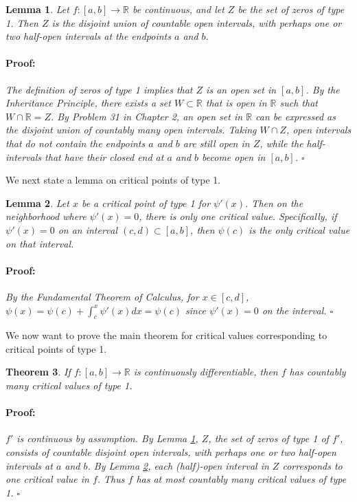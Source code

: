 \documentclass{article}
\newenvironment{proof}{\paragraph{Proof:}}{\hfill$\square$}
\newtheorem{theorem}{Theorem}
\newtheorem{lemma}[theorem]{Lemma}
\newcommand{\R}{\mathbb{R}}
\begin{document}
\begin{lemma}
\label{LemmaZerosType1}
Let $f: [a, b] \rightarrow \R$ be continuous, and let $Z$ be the set of zeros of type 1. Then $Z$ is the  disjoint union of countable open intervals, with perhaps one or two half-open intervals at the endpoints $a$ and $b$.
\begin{proof}
The definition of zeros of type 1 implies that $Z$ is an open set in $[a, b]$. By the Inheritance Principle, there exists a set $W \subset \R$ that is open in $\R$ such that $W \cap \R = Z$. By Problem 31 in Chapter 2, an open set in $\R$ can be expressed as the disjoint union of countably many open intervals. Taking $W \cap Z$, open intervals that do not contain the endpoints $a$ and $b$ are still open in $Z$, while the half-intervals that have their closed end at $a$ and $b$ become open in $[a, b]$.
\end{proof}
\end{lemma}

We next state a lemma on critical points of type 1.

\begin{lemma}
\label{LemmaCriticalValuesType1}
Let $x$ be a critical point of type 1 for $\psi'(x)$. Then on the neighborhood where $\psi'(x) = 0$, there is only one critical value. Specifically, if $\psi'(x) = 0$ on an interval $(c, d) \subset [a, b]$, then $\psi(c)$ is the only critical value on that interval.
\begin{proof}
By the Fundamental Theorem of Calculus, for $x \in [c, d]$, $\psi(x) = \psi(c) + \int_c^x \psi'(x) dx = \psi(c)$ since $\psi'(x) = 0$ on the interval. 
\end{proof}
\end{lemma}

We now want to prove the main theorem for critical values corresponding to critical points of type 1.

\begin{theorem}
If $f: [a, b] \rightarrow \R$ is continuously differentiable, then $f$ has countably many critical values of type 1.
\begin{proof}
$f'$ is continuous by assumption. By Lemma \ref{LemmaZerosType1}, $Z$, the set of zeros of type 1 of $f'$, consists of countable disjoint open intervals, with perhaps one or two half-open intervals at $a$ and $b$. By Lemma \ref{LemmaCriticalValuesType1}, each (half)-open interval in $Z$ corresponds to one critical value in $f$. Thus $f$ has at most countably many critical values of type 1.
\end{proof}
\end{theorem}
\end{document}
